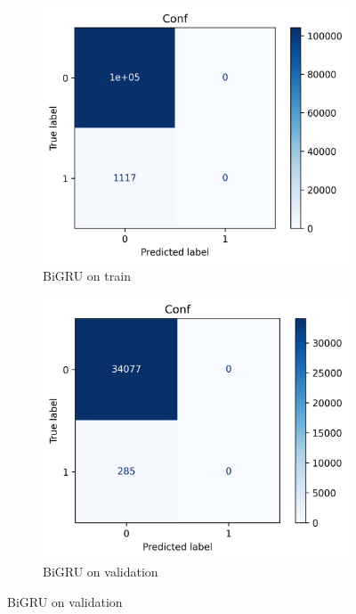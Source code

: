 \documentclass[utf8x]{ctexart}
\begin{document}
\begin{figure}[htb]
  \begin{subfigure}[b]{0.32\textwidth}
    \centering
    \includegraphics[width=\textwidth]{../images/BiGRU_train_conf.png}
    \caption{BiGRU on train}
    \label{fig:BiGRU_confusion_train}
  \end{subfigure}
  \begin{subfigure}[b]{0.32\textwidth}
    \centering
    \includegraphics[width=\textwidth]{../images/BiGRU_val_conf.png}
    \caption{BiGRU on validation}
    \label{fig:BiGRU_confusion_val}
  \end{subfigure}

\end{figure}
\end{document}
